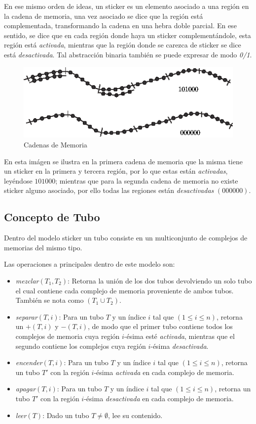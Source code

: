 \documentclass[12pt, letterpaper, twoside]{article}
\begin{document}
    En ese mismo orden de ideas, un sticker es un elemento asociado a una región en la cadena de memoria, una vez asociado se dice que la región está complementada, transformando la cadena en una hebra doble parcial. En ese sentido, se dice que en cada región donde haya un sticker complementándole, esta región está \emph{activada}, mientras que la región donde se carezca de sticker se dice está \emph{desactivada}. Tal abstracción binaria también se puede expresar de modo \emph{0/1}.

    \newpage
    \begin{figure}[h!]
        \centering
        \includegraphics[width=\linewidth]{sticker.png}
        \caption{Cadenas de Memoria}
    \end{figure}

    En esta imágen se ilustra en la primera cadena de memoria que la misma tiene un sticker en la primera y tercera región, por lo que estas están \emph{activadas}, leyéndose $101000$; mientras que para la segunda cadena de memoria no existe sticker alguno asociado, por ello todas las regiones están \emph{desactivadas} $(000000)$.

    \subsection{Concepto de Tubo}
    Dentro del modelo sticker un tubo consiste en un multiconjunto de complejos de memorias del mismo tipo.

    Las operaciones a principales dentro de este modelo son:
    \begin{itemize}
        \item \emph{mezclar}$(T_1,T_2)$: Retorna la unión de los dos tubos devolviendo un solo tubo el cual contiene cada complejo de memoria proveniente de ambos tubos. También se nota como $(T_1\cup T_2)$.
        \item \emph{separar}$(T, i)$: Para un tubo $T$ y un índice $i$ tal que $(1 \leq i \leq n)$, retorna un $+(T, i)$ y $-(T, i)$, de modo que el primer tubo contiene todos los complejos de memoria cuya región $i$-ésima esté \emph{activada}, mientras que el segundo contiene los complejos cuya región $i$-ésima \emph{desactivada}.
        \item \emph{encender}$(T, i)$: Para un tubo $T$ y un índice $i$ tal que $(1 \leq i \leq n)$, retorna un tubo $T'$ con la región $i$-ésima \emph{activada} en cada complejo de memoria.
        \item \emph{apagar}$(T, i)$: Para un tubo $T$ y un índice $i$ tal que $(1 \leq i \leq n)$, retorna un tubo $T'$ con la región $i$-ésima \emph{desactivada} en cada complejo de memoria.
        \item \emph{leer}$(T)$: Dado un tubo $T\neq\emptyset$, lee su contenido.
    \end{itemize}
\end{document}
